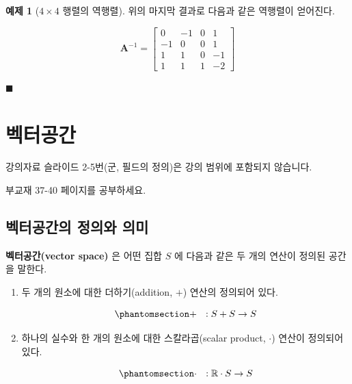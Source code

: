 \documentclass[
  11pt,
  a4paper,
  oneside]{scrbook}
\newcommand{\RR}{\mathbb{R}}
\theoremstyle{definition}
\theoremstyle{definition}
\newtheorem{exercise}{예제}[chapter]
\theoremstyle{plain}
\theoremstyle{remark}
\begin{document}
\begin{exercise}[\(4 \times 4\) 행렬의
역행렬]
위의 마지막 결과로 다음과 같은 역행렬이 얻어진다.

\[ 
\pmb A^{-1} =
\begin{bmatrix}
0 & -1 & 0 & 1\\
-1 & 0 & 0 & 1 \\
1 & 1 & 0 & -1 \\
1 & 1 & 1 & -2
\end{bmatrix}
\]

\(\blacksquare\)

\end{exercise}


\chapter{벡터공간}\label{vector_space}

\begin{tcolorbox}[enhanced jigsaw, colback=white, colframe=quarto-callout-note-color-frame, opacityback=0, toprule=.15mm, leftrule=.75mm, titlerule=0mm, opacitybacktitle=0.6, title=\textcolor{quarto-callout-note-color}{\faInfo}\hspace{0.5em}{노트}, colbacktitle=quarto-callout-note-color!10!white, breakable, bottomrule=.15mm, bottomtitle=1mm, toptitle=1mm, arc=.35mm, left=2mm, rightrule=.15mm, coltitle=black]

강의자료 슬라이드 2-5번(군, 필드의 정의)은 강의 범위에 포함되지
않습니다.

부교재 37-40 페이지를 공부하세요.

\end{tcolorbox}

\section{벡터공간의 정의와
의미}\label{uxbca1uxd130uxacf5uxac04uxc758-uxc815uxc758uxc640-uxc758uxbbf8}

\textbf{벡터공간(vector space)} 은 어떤 집합 \(S\) 에 다음과 같은 두
개의 연산이 정의된 공간을 말한다.

\begin{enumerate}
\def\labelenumi{\arabic{enumi}.}
\item
  두 개의 원소에 대한 더하기(addition, \(+\)) 연산의 정의되어 있다.

  \begin{equation}\phantomsection\label{eq-vectorspace-def-1}{+ ~ ~ : S + S \rightarrow  S}\end{equation}
\item
  하나의 실수와 한 개의 원소에 대한 스칼라곱(scalar product, \(\cdot\))
  연산이 정의되어 있다.

  \begin{equation}\phantomsection\label{eq-vectorspace-def-2}{\cdot ~ ~ : \RR \cdot S \rightarrow  S}\end{equation}
\end{enumerate}
\end{document}
